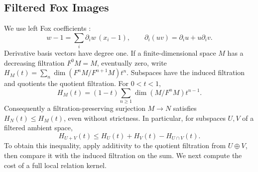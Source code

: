 \subsection{Filtered Fox Images}
We use left Fox coefficients \cite{Fox1953}:
\[
 w-1=\sum_i\partial_iw\,(x_i-1),\qquad
 \partial_i(uv)=\partial_i u+u\partial_i v.
\]
Derivative basis vectors have degree one. If a finite-dimensional space
$M$ has a decreasing filtration $F^0M=M$, eventually zero, write
$H_M(t)=\sum_n\dim(F^nM/F^{n+1}M)t^n$. Subspaces have the induced
filtration and quotients the quotient filtration. For $0<t<1$,
\[
 H_M(t)=(1-t)\sum_{n\ge1}\dim(M/F^nM)t^{n-1}.
\]
Consequently a filtration-preserving surjection $M\to N$ satisfies
$H_N(t)\le H_M(t)$, even without strictness. In particular, for subspaces
$U,V$ of a filtered ambient space,
\begin{equation}\label{tw:filtered-sum}
 H_{U+V}(t)\le H_U(t)+H_V(t)-H_{U\cap V}(t).
\end{equation}
To obtain this inequality, apply additivity to the quotient filtration
from $U\oplus V$, then compare it with the induced filtration on the sum.
We next compute the cost of a full local relation kernel.

